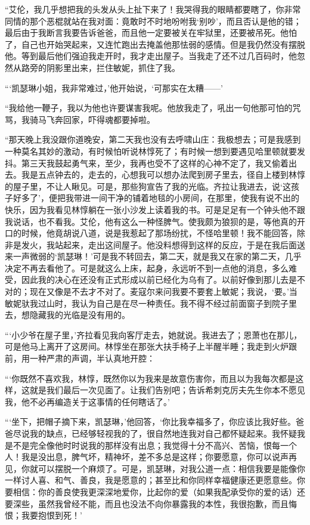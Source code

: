 \par “艾伦，我几乎想把我的头发从头上扯下来了！我哭得我的眼睛都要瞎了，你非常同情的那个恶棍就站在我对面：竟敢时不时地吩咐我‘别吵’，而且否认是他的错；最后由于我断言我要告诉爸爸，而且他一定要被关在牢狱里，还要被吊死。他怕了，自己也开始哭起来，又连忙跑出去掩盖他那怯弱的感情。但是我仍然没有摆脱他。等到最后他们强迫我走开时，我才走出屋子。当我走了还不过几百码时，他忽然从路旁的阴影里出来，拦住敏妮，抓住了我。
\par “‘凯瑟琳小姐，我非常难过，’他开始说，‘可那实在太糟——’
\par “我给他一鞭子，我以为他也许要谋害我呢。他放我走了，吼出一句他那可怕的咒骂，我骑马飞奔回家，吓得魂都要掉啦。
\par “那天晚上我没跟你道晚安，第二天我也没有去呼啸山庄：我极想去；可是我感到一种莫名其妙的激动，有时候怕听说林惇死了；有时候一想到要遇见哈里顿就要发抖。第三天我鼓起勇气来，至少，我再也受不了这样的心神不定了，我又偷着出去。我是五点钟去的，走去的，心想我可以想办法爬到房子里去，径自上楼到林惇的屋子里，不让人瞅见。可是，那些狗宣告了我的光临。齐拉让我进去，说‘这孩子好多了’，便把我带进一间干净的铺着地毯的小房间，在那里，使我有说不出的快乐，因为我看见林惇躺在一张小沙发上读着我的书。可是足足有一个钟头他不跟我说话，也不看我。艾伦，他有这么一种怪脾气。使我颇为狼狈的是，等他真的开口的时候，他竟胡说八道，说是我惹起了那场纷扰，不怪哈里顿！我不能回答，除非是发火，我站起来，走出这间屋子。他没料想得到这样的反应，于是在我后面送来一声微弱的‘凯瑟琳！’可是我不转回去，第二天，就是我又在家的第二天，几乎决定不再去看他了。可是就这么上床，起身，永远听不到一点他的消息，多么难受，因此我的决心在还没有正式形成以前已经化为乌有了。以前好像到那儿去是不对的；现在又像是不去才不对了。麦寇尔来问我要不要套上敏妮；我说，‘要。’当敏妮驮我过山时，我认为自己是在尽一种责任。我不得不经过前面窗子到院子里去，想隐藏我的光临是没有用的。
\par “‘小少爷在屋子里，’齐拉看见我向客厅走去，她就说。我进去了；恩萧也在那儿，可是他马上离开了这房间。林惇坐在那张大扶手椅子上半醒半睡；我走到火炉跟前，用一种严肃的声调，半认真地开腔：
\par “‘你既然不喜欢我，林惇，既然你以为我来是故意伤害你，而且以为我每次都是这样，这就是我们最后一次见面了。让我们告别吧；告诉希刺克厉夫先生你本不愿见我，他不必再编造关于这事情的任何瞎话了。’
\par “‘坐下，把帽子摘下来，凯瑟琳，’他回答，‘你比我幸福多了，你应该比我好些。爸爸尽说我的缺点，已经够轻视我的了，很自然地连我对自己都怀疑起来。我怀疑我是不是完全像他时时说我的那样没有出息；我觉得十分不高兴、苦恼，恨每一个人！我是没出息，脾气坏，精神坏，差不多总是这样；你要愿意，你可以说声再见，你就可以摆脱一个麻烦了。可是，凯瑟琳，对我公道一点：相信我要是能像你一样讨人喜、和气、善良，我是愿意的；甚至比和你同样幸福健康还更愿意些。你要相信：你的善良使我更深深地爱你，比起你的爱（如果我配承受你的爱的话）还要深些，虽然我曾经不能，而且也没法不向你暴露我的本性，我很抱歉，而且悔恨；我要抱恨到死！’
